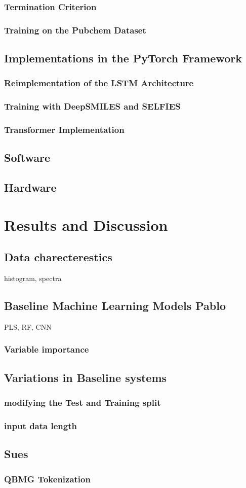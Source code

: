 \documentclass[12pt,a4paper]{report}
\begin{document}
\subsection{Termination Criterion}
\subsection{Training on the Pubchem Dataset}

\section{Implementations in the PyTorch Framework}
\subsection{Reimplementation of the LSTM Architecture}
\subsection{Training with DeepSMILES and SELFIES}
\subsection{Transformer Implementation}

\section{Software}
\section{Hardware}

\chapter{Results and Discussion}

\section{Data charecterestics}
histogram, spectra
\section{Baseline Machine Learning Models Pablo}
PLS, RF, CNN

\subsection{Variable importance}

\section{ Variations in Baseline systems}
\subsection{ modifying the Test and Training split}
\subsection{ input data length}

\section{Sues}
\subsection{QBMG Tokenization}
\end{document}
